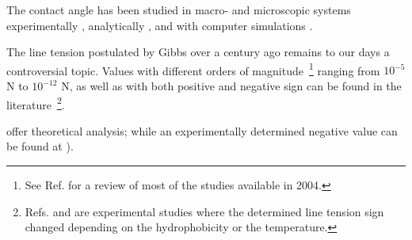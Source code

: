 The contact angle has been studied in macro- and microscopic systems
experimentally \cite{meiron:2004,tadmor:2008,extrand:2003}, analytically
\cite{kwok:1999,decker:1999}, and with computer simulations \cite{werder:2003,gietzelt:2001}.

The line tension \textendash{} postulated by Gibbs over a century
ago \cite{gibbs:1873,gibbs:1948} \textendash{} remains to our days
a controversial topic. Values with different orders of magnitude~\footnote{See Ref. \cite{amirfazli:2004} for a review of most of the studies available in 2004.}
ranging from $10^{-5}$ N to $10^{-12}$ N, as well as with both positive
\cite{weijs:2011,koga:2007,amirfazli:2003,lee:2003,werder:2003} and
negative sign \cite{lin:2012,hienola:2007} can be found in the literature~\footnote{Refs. \cite{pompe:2002} and \cite{wang:2001} are experimental studies where the determined line tension sign changed depending on the hydrophobicity or the temperature.}.

\cite{rusanov:1999,taylor:2005,schimmele:2007,weijs:2011} offer theoretical
analysis; while an experimentally determined negative value can be
found at \cite{hienola:2007}).